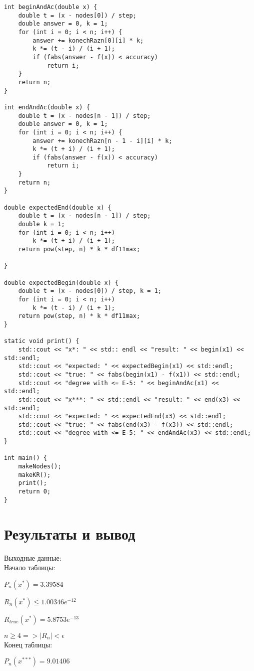 \documentclass[10pt]{scrartcl}
\begin{document}
\begin{verbatim}
int beginAndAc(double x) {
    double t = (x - nodes[0]) / step;
    double answer = 0, k = 1;
    for (int i = 0; i < n; i++) {
        answer += konechRazn[0][i] * k;
        k *= (t - i) / (i + 1);
        if (fabs(answer - f(x)) < accuracy)
            return i;
    }
    return n;
}

int endAndAc(double x) {
    double t = (x - nodes[n - 1]) / step;
    double answer = 0, k = 1;
    for (int i = 0; i < n; i++) {
        answer += konechRazn[n - 1 - i][i] * k;
        k *= (t + i) / (i + 1);
        if (fabs(answer - f(x)) < accuracy)
            return i;
    }
    return n;
}

double expectedEnd(double x) {
    double t = (x - nodes[n - 1]) / step;
    double k = 1;
    for (int i = 0; i < n; i++)
        k *= (t + i) / (i + 1);
    return pow(step, n) * k * df11max;

}

double expectedBegin(double x) {
    double t = (x - nodes[0]) / step, k = 1;
    for (int i = 0; i < n; i++)
        k *= (t - i) / (i + 1);
    return pow(step, n) * k * df11max;
}

static void print() {
    std::cout << "x*: " << std:: endl << "result: " << begin(x1) << std::endl;
    std::cout << "expected: " << expectedBegin(x1) << std::endl;
    std::cout << "true: " << fabs(begin(x1) - f(x1)) << std::endl;
    std::cout << "degree with <= E-5: " << beginAndAc(x1) << std::endl;
    std::cout << "x***: " << std::endl << "result: " << end(x3) << std::endl;
    std::cout << "expected: " << expectedEnd(x3) << std::endl;
    std::cout << "true: " << fabs(end(x3) - f(x3)) << std::endl;
    std::cout << "degree with <= E-5: " << endAndAc(x3) << std::endl;
}

int main() {
    makeNodes();
    makeKR();
    print();
    return 0;
}
\end{verbatim}
\section*{Результаты и вывод}\noindent
Выходные данные:\\
Начало таблицы:

$P_n(x^*) = 3.39584$

$R_n(x^*) \leq 1.00346e^{-12}$

$R_{true}(x^*) = 5.8753e^{-13}$

$n \geq 4 => |R_n| < \epsilon$\\
Конец таблицы:

$P_n(x^{***})= 9.01406$
\end{document}
